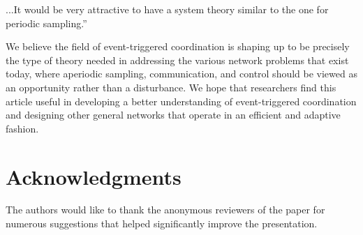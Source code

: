 \documentclass{autart}
\begin{document}
{\begin{displayquote}
...It would be very attractive to have a system theory similar to the
one for periodic sampling.''
\end{displayquote}

We believe the field of event-triggered coordination is shaping up to
be precisely the type of theory needed in addressing the various
network problems that exist today, where aperiodic sampling,
communication, and control should be viewed as an opportunity rather
than a disturbance. We hope that researchers find this article useful
in developing a better understanding of event-triggered coordination
and designing other general networks that operate in an efficient and
adaptive fashion.

\section*{Acknowledgments}
The authors would like to thank the anonymous reviewers of the paper
for numerous suggestions that helped significantly improve the
presentation.
  }
\end{document}
